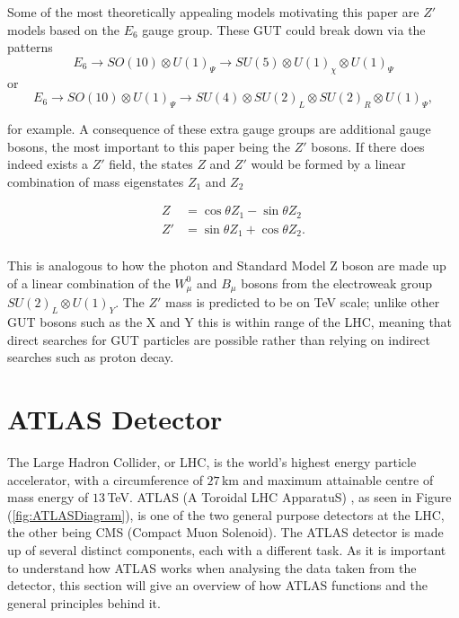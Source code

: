 \documentclass{article}
\begin{document}
Some of the most theoretically appealing models motivating this paper are $Z'$ models based on the  $E_6$ gauge group. These GUT could break down via the patterns \cite{ExtraGaugeBosonsE6}
\begin{equation}
E_{6} \rightarrow SO(10) \otimes U(1)_\Psi \rightarrow SU(5)\otimes U(1)_\chi \otimes U(1)_\Psi
\end{equation}
or 
\begin{equation}
E_{6} \rightarrow SO(10) \otimes U(1)_\Psi \rightarrow SU(4) \otimes SU(2)_L \otimes SU(2)_R \otimes U(1)_\Psi,
\end{equation}

for example. A consequence of these extra gauge groups are additional gauge bosons, the most important to this paper being the $Z'$ bosons. If there does indeed exists a $Z'$ field, the states $Z$ and $Z'$ would be formed by a linear combination of mass eigenstates $Z_1$ and $Z_2$ \cite{ColliderPhysics}

\begin{equation}
\begin{split}
Z & = \cos\theta Z_1 - \sin\theta Z_2 \\
Z' & = \sin\theta Z_1 + \cos\theta Z_2. \\
\end{split}
\end{equation}

This is analogous to how the photon and Standard Model Z boson are made up of a linear combination of the $W^{0}_\mu$ and $B_\mu$ bosons from the electroweak group $SU(2)_L \otimes U(1)_Y$. The $Z'$ mass is predicted to be on TeV scale; unlike other GUT bosons such as the X and Y this is within range of the LHC,  meaning that direct searches for GUT particles are possible rather than relying on indirect searches such as proton decay.




\section{ATLAS Detector}%
\label{sec:ATLAS}

The Large Hadron Collider, or LHC, is the world's highest energy particle accelerator, with a circumference of $27\,$km and maximum attainable centre of mass energy of $13\,$TeV. 
ATLAS (A Toroidal LHC ApparatuS) \cite{ATLAS}, as seen in Figure (\ref{fig:ATLASDiagram}), is one of the two general purpose detectors at the LHC, the other being CMS (Compact Muon Solenoid). The ATLAS detector is made up of several distinct components, each with a different task. As it is important to understand how ATLAS works when analysing the data taken from the detector, this section will give an overview of how ATLAS functions and the general principles behind it.
\end{document}
